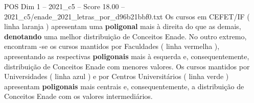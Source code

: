\begin{textsample}{POS Dim 1 – 2021\_c5 – Score 18.00 – 2021\_c5/enade\_2021\_letras\_por\_d96b21bbf0.txt}
Os cursos em CEFET/IF ( linha laranja ) apresentam uma \textbf{poligonal} mais à direita do que as demais, \textbf{denotando} uma melhor distribuição de Conceitos Enade.
No outro extremo, encontram -se os cursos mantidos por Faculdades ( linha vermelha ), apresentando as respectivas \textbf{poligonais} mais à esquerda e, consequentemente, distribuição de Conceitos Enade com menores valores.
Os cursos mantidos por Universidades ( linha azul ) e por Centros Universitários ( linha verde ) apresentam \textbf{poligonais} mais centrais e, consequentemente, a distribuição de Conceitos Enade com os valores intermediários.

\end{textsample}
